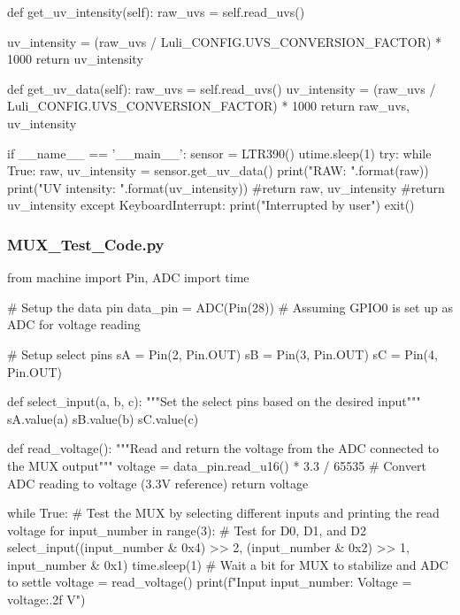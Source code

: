 \documentclass[12pt]{article} %
\begin{document}
\begin{pythoncode}[caption={Pico W UV Sensor Code}]
        def get_uv_intensity(self):
            raw_uvs = self.read_uvs()
            
            uv_intensity = (raw_uvs / Luli_CONFIG.UVS_CONVERSION_FACTOR) * 1000
            return uv_intensity
        
        def get_uv_data(self):
            raw_uvs = self.read_uvs()
            uv_intensity = (raw_uvs / Luli_CONFIG.UVS_CONVERSION_FACTOR) * 1000
            return raw_uvs, uv_intensity
        
    
    
    if __name__ == '__main__':
        sensor = LTR390()
        utime.sleep(1)
        try:
            while True:
                raw, uv_intensity = sensor.get_uv_data()
                print("RAW: {}".format(raw))
                print("UV intensity: {}".format(uv_intensity))
                #return raw, uv_intensity
                #return uv_intensity
        except KeyboardInterrupt:
            print("Interrupted by user")
            exit()
    
    
\end{pythoncode}
\subsubsection{MUX\_Test\_Code.py}
\label{appendix:muxTest}
\begin{pythoncode}[caption={Pico W MUX Test Code}]
    from machine import Pin, ADC
    import time
    
    # Setup the data pin
    data_pin = ADC(Pin(28))  # Assuming GPIO0 is set up as ADC for voltage reading
    
    # Setup select pins
    sA = Pin(2, Pin.OUT)
    sB = Pin(3, Pin.OUT)
    sC = Pin(4, Pin.OUT)
    
    def select_input(a, b, c):
        """Set the select pins based on the desired input"""
        sA.value(a)
        sB.value(b)
        sC.value(c)
    
    def read_voltage():
        """Read and return the voltage from the ADC connected to the MUX output"""
        voltage = data_pin.read_u16() * 3.3 / 65535  # Convert ADC reading to voltage (3.3V reference)
        return voltage
    
    
    while True:
        # Test the MUX by selecting different inputs and printing the read voltage
        for input_number in range(3):  # Test for D0, D1, and D2
            select_input((input_number & 0x4) >> 2, (input_number & 0x2) >> 1, input_number & 0x1)
            time.sleep(1)  # Wait a bit for MUX to stabilize and ADC to settle
            voltage = read_voltage()
            print(f"Input {input_number}: Voltage = {voltage:.2f} V")
    
    
\end{pythoncode}
\end{document}
